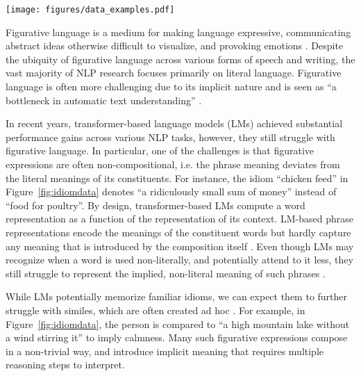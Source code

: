 \begin{figure*}[t]
    \centering
    \texttt{[image: figures/data\_examples.pdf]}
    \caption{Example narratives from our datasets, containing an idiom (top) or a simile (bottom), along with human-written plausible and implausible continuations.}
    \label{fig:idiomdata}
\end{figure*}

Figurative language is a medium for making language expressive, communicating abstract ideas otherwise difficult to visualize, and provoking emotions \cite{roberts1994people,fussell1998figurative}. Despite the ubiquity of figurative language across various forms of speech and writing, the vast majority of NLP research focuses primarily on literal language. Figurative language is often more challenging due to its implicit nature and is seen as ``a  bottleneck in automatic text understanding'' \cite{shutova2011computational}. 

In recent years, transformer-based language models (LMs) achieved substantial performance gains across various NLP tasks, however, they still struggle with figurative language. In particular, one of the challenges is that figurative expressions are often non-compositional, i.e. the phrase meaning deviates from the literal meanings of its constituents. For instance, the idiom ``chicken feed'' in Figure~\ref{fig:idiomdata} denotes ``a ridiculously small sum of money'' instead of ``food for poultry''. By design, transformer-based LMs compute a word representation as a function of the representation of its context. LM-based phrase representations encode the meanings of the constituent words but hardly capture any meaning that is introduced by the composition itself \cite{yu-ettinger-2020-assessing}. Even though LMs may recognize when a word is used non-literally, and potentially attend to it less, they still struggle to represent the implied, non-literal meaning of such phrases \cite{shwartz-dagan-2019-still}. 

While LMs potentially memorize familiar idioms, we can expect them to further struggle with similes, which are often created ad hoc \cite{carston_wearing_2011}. For example, in Figure~\ref{fig:idiomdata}, the person is compared to ``a high mountain lake without a wind stirring it'' to imply calmness. Many such figurative expressions compose in a non-trivial way, and introduce implicit meaning that requires multiple reasoning steps to interpret. 
 



